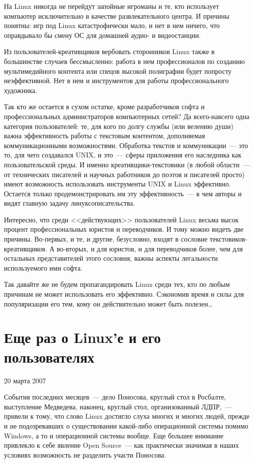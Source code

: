 На Linux никогда не перейдут запойные игроманы и те, кто использует компьютер исключительно в качестве развлекательного центра. И причины понятны: игр под Linux катастрофически мало, и нет в нем ничего, что оправдывало бы смену ОС для домашней аудио- и видеостанции.

Из пользователей-креативщиков вербовать сторонников Linux также в большинстве случаев бессмысленно: работа в нем профессионалов по созданию мультимедийного контента или спецов высокой полиграфии будет попросту неэффективной. Нет в нем и инструментов для работы профессионального художника.

Так кто же остается в сухом остатке, кроме разработчиков софта и профессиональных администраторов компьютерных сетей? Да всего-навсего одна категория пользователей: те, для кого по долгу службы (или велению души) важна эффективность работы с текстовым контентом, дополняемая коммуникационными возможностями. Обработка текстов и коммуникации~--- это то, для чего создавался UNIX, и это~--- сферы приложения его наследника как пользовательской среды. И именно креативщики-текстовики (в любой области~--- от технических писателей и научных работников до поэтов и писателей просто) имеют возможность использовать инструменты UNIX и Linux эффективно. Остается только продемонстрировать им эту эффективность~--- в чем авторы и видят главную задачу линуксописательства.

Интересно, что среди <<действующих>> пользователей Linux весьма высок процент профессиональных юристов и переводчиков. И тому можно видеть две причины. Во-первых, и те, и другие, безусловно, входят в сословие текстовиков-креативщиков. А во-вторых, и для юристов, и для переводчиков более, чем для остальных представителей этого сословия, важны аспекты легальности используемого ими софта.

Так давайте же не будем пропагандировать Linux среди тех, кто по любым причинам не может использовать его эффективно. Сэкономив время и силы для популяризации его тем, кому он действительно может быть полезен\dots

\section{Еще раз о Linux'е и его пользователях} 
\begin{timeline}20 марта 2007\end{timeline}

События последних месяцев~--- дело Поносова, круглый стол в Росбалте, выступление Медведева, наконец, круглый стол, организованный ЛДПР,~--- привели к тому, что слово Linux достигло слуха многих и многих людей, прежде и не подозревавших о существовании какой-либо операционной системы помимо Windows, а то и операционной системы вообще. Еще большее внимание привлекло к себе явление Open Source~--- как практически значимая в наших условиях возможность не разделить участи Поносова.

